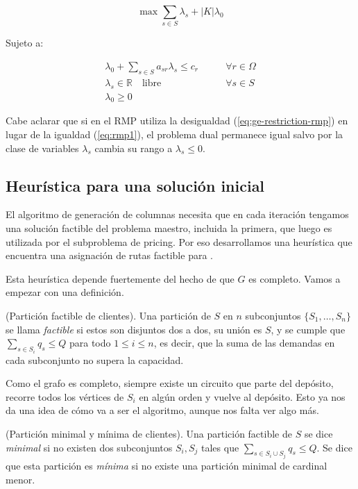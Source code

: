 \begin{equation}
    \max \sum_{s \in S} \lambda_s + |K| \lambda_0 
\end{equation}

Sujeto a:

\begin{align}
    \lambda_0 + \sum_{s \in S} {a_{sr} \lambda_s} \leq c_r \qquad & \forall {r \in \Omega} \\
\lambda_s \in \mathbb{R} \quad \text{libre}
\qquad &\forall {s \in S} \\
\lambda_0 \geq 0 &
\end{align}

Cabe aclarar que si en el RMP utiliza la desigualdad (\ref{eq:ge-restriction-rmp}) en lugar de la igualdad (\ref{eq:rmp1}), el problema dual permanece igual salvo por la clase de variables $\lambda_s$ cambia su rango a $\lambda_s \leq 0$. 


\subsection{Heurística para una solución inicial}
\label{section:initial-solution-heuristic}

El algoritmo de generación de columnas necesita que en cada iteración tengamos una solución factible del problema maestro, incluida la primera, que luego es utilizada por el subproblema de pricing. Por eso desarrollamos una heurística que encuentra una asignación de rutas factible para .

Esta heurística depende fuertemente del hecho de que $G$ es completo. Vamos a empezar con una definición.

\begin{definition}
    (Partición factible de clientes).
    Una partición de $S$ en $n$ subconjuntos $\{S_1, \dots, S_n\}$ se llama \emph{factible} si estos son disjuntos dos a dos, su unión es $S$, y se cumple que $\sum_{s \in S_i} q_s \leq Q$ para todo $1 \leq i \leq n$, es decir, que la suma de las demandas en cada subconjunto no supera la capacidad.
\end{definition}

Como el grafo es completo, siempre existe un circuito que parte del depósito, recorre todos los vértices de $S_i$ en algún orden y vuelve al depósito. Esto ya nos da una idea de cómo va a ser el algoritmo, aunque nos falta ver algo más. 

\begin{definition}
    (Partición minimal y mínima de clientes).
    Una partición factible de $S$ se dice \emph{minimal} si no existen dos subconjuntos $S_i, S_j$ tales que $\sum_{s \in S_i \cup S_j} q_s \leq Q$. Se dice que esta partición es \emph{mínima} si no existe una partición minimal de cardinal menor.
\end{definition}

